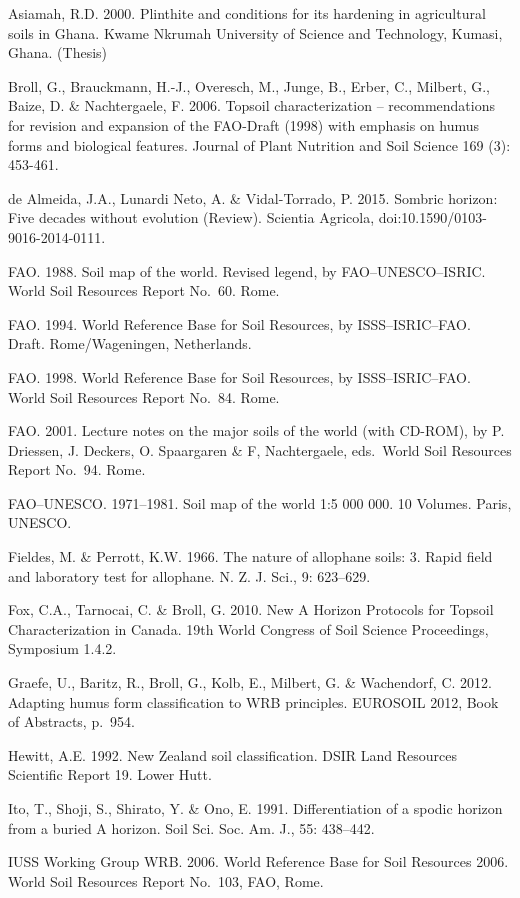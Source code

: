 \documentclass[
  letterpaper,
  DIV=11,
  numbers=noendperiod]{scrreprt}
\begin{document}
Asiamah, R.D. 2000. Plinthite and conditions for its hardening in
agricultural soils in Ghana. Kwame Nkrumah University of Science and
Technology, Kumasi, Ghana. (Thesis)

Broll, G., Brauckmann, H.-J., Overesch, M., Junge, B., Erber, C.,
Milbert, G., Baize, D. \& Nachtergaele, F. 2006. Topsoil
characterization -- recommendations for revision and expansion of the
FAO-Draft (1998) with emphasis on humus forms and biological features.
Journal of Plant Nutrition and Soil Science 169 (3): 453-461.

de Almeida, J.A., Lunardi Neto, A. \& Vidal-Torrado, P. 2015. Sombric
horizon: Five decades without evolution (Review). Scientia Agricola,
doi:10.1590/0103-9016-2014-0111.

FAO. 1988. Soil map of the world. Revised legend, by FAO--UNESCO--ISRIC.
World Soil Resources Report No.~60. Rome.

FAO. 1994. World Reference Base for Soil Resources, by ISSS--ISRIC--FAO.
Draft. Rome/Wageningen, Netherlands.

FAO. 1998. World Reference Base for Soil Resources, by ISSS--ISRIC--FAO.
World Soil Resources Report No.~84. Rome.

FAO. 2001. Lecture notes on the major soils of the world (with CD-ROM),
by P. Driessen, J. Deckers, O. Spaargaren \& F, Nachtergaele, eds.~World
Soil Resources Report No.~94. Rome.

FAO--UNESCO. 1971--1981. Soil map of the world 1:5 000 000. 10 Volumes.
Paris, UNESCO.

Fieldes, M. \& Perrott, K.W. 1966. The nature of allophane soils: 3.
Rapid field and laboratory test for allophane. N. Z. J. Sci., 9:
623--629.

Fox, C.A., Tarnocai, C. \& Broll, G. 2010. New A Horizon Protocols for
Topsoil Characterization in Canada. 19th World Congress of Soil Science
Proceedings, Symposium 1.4.2.

Graefe, U., Baritz, R., Broll, G., Kolb, E., Milbert, G. \& Wachendorf,
C. 2012. Adapting humus form classification to WRB principles. EUROSOIL
2012, Book of Abstracts, p.~954.

Hewitt, A.E. 1992. New Zealand soil classification. DSIR Land Resources
Scientific Report 19. Lower Hutt.

Ito, T., Shoji, S., Shirato, Y. \& Ono, E. 1991. Differentiation of a
spodic horizon from a buried A horizon. Soil Sci. Soc. Am. J., 55:
438--442.

IUSS Working Group WRB. 2006. World Reference Base for Soil Resources
2006. World Soil Resources Report No.~103, FAO, Rome.
\end{document}
